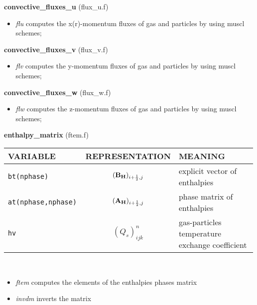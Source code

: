 %
{\large{\bf convective\_fluxes\_u}} (flux\_u.f)\\
\begin{itemize}
\item {\em flu} computes the x(r)-momentum fluxes of gas and particles by using muscl schemes;\\
\end{itemize}
%
%
{\large{\bf convective\_fluxes\_v}} (flux\_v.f)\\
\begin{itemize}
\item {\em flv} computes the y-momentum fluxes of gas and particles by using muscl schemes;\\
\end{itemize}
%
%
{\large{\bf convective\_fluxes\_w}} (flux\_w.f)\\
\begin{itemize}
\item {\em flw} computes the z-momentum fluxes of gas and particles by using muscl schemes;\\
\end{itemize}
%
%
{\large{\bf enthalpy\_matrix}} (ftem.f)\\[5mm]
\begin{tabular}{|p{6cm}|c|p{6cm}|}\hline
VARIABLE & REPRESENTATION & MEANING\\\hline
\tt bt(nphase)  & $({\bf B_H})_{i+\frac{1}{2},j}$ & explicit vector 
of enthalpies \\ \hline
\tt at(nphase,nphase) & $({\bf A_H})_{i+\frac{1}{2},j}$ & phase matrix of enthalpies\\\hline
\tt hv               & $(Q_s)_{ijk}^n$ & gas-particles temperature exchange coefficient\\\hline
\end{tabular}\\
\begin{itemize}
\item{\em ftem} computes the elements of the enthalpies phases matrix\\
\item{\em invdm} inverts the matrix\\
\end{itemize}
%
